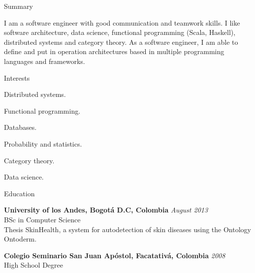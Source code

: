 \documentclass[spanish]{resume}
\begin{document}

\begin{rSection}{Summary}

I am a software engineer with good communication and teamwork skills. I like software architecture, data science, functional programming (Scala, Haskell), distributed systems and category theory. As a software engineer, I am able to define and put in operation architectures based in multiple programming languages and frameworks. 

\end{rSection}

\begin{rSection}{Interests}

\item Distributed systems.
\item Functional programming.
\item Databases.
\item Probability and statistics.
\item Category theory.
\item Data science.


\end{rSection}


\begin{rSection}{Education}

{\bf University of los Andes, Bogot\'a D.C, Colombia} \hfill {\em August 2013} \\
BSc in Computer Science \\
Thesis SkinHealth, a system for autodetection of skin diseases using the Ontology Ontoderm.

{\bf Colegio Seminario San Juan Ap\'ostol, Facatativ\'a, Colombia} \hfill {\em 2008} \\
 High School Degree

\end{rSection}
\end{document}
